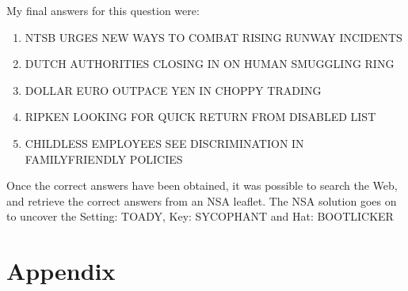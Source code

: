 \documentclass[11pt,a4paper,twoside]{article}
\begin{document}
My final answers for this question were: 

\begin{enumerate}[noitemsep]
\item NTSB URGES NEW WAYS TO COMBAT RISING RUNWAY INCIDENTS
\item DUTCH AUTHORITIES CLOSING IN ON HUMAN SMUGGLING RING
\item DOLLAR EURO OUTPACE YEN IN CHOPPY TRADING
\item RIPKEN LOOKING FOR QUICK RETURN FROM DISABLED LIST
\item CHILDLESS EMPLOYEES SEE DISCRIMINATION IN FAMILYFRIENDLY POLICIES
\end{enumerate}

Once the correct answers have been obtained, it was possible to search the Web,
and retrieve the correct answers from an NSA leaflet. The NSA solution goes on
to uncover the Setting: TOADY, Key: SYCOPHANT and Hat: BOOTLICKER


%
%
%

\vfill
\pagebreak
\section*{Appendix} 
\appendix 
\end{document}
